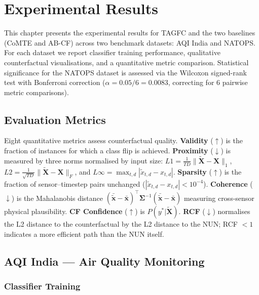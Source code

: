 \chapter{Experimental Results}

This chapter presents the experimental results for TAGFC and the two baselines (CoMTE and AB-CF) across two benchmark datasets: AQI India and NATOPS. For each dataset we report classifier training performance, qualitative counterfactual visualisations, and a quantitative metric comparison. Statistical significance for the NATOPS dataset is assessed via the Wilcoxon signed-rank test with Bonferroni correction ($\alpha = 0.05/6 = 0.0083$, correcting for 6 pairwise metric comparisons).

\section{Evaluation Metrics}

Eight quantitative metrics assess counterfactual quality. \textbf{Validity} ($\uparrow$) is the fraction of instances for which a class flip is achieved. \textbf{Proximity} ($\downarrow$) is measured by three norms normalised by input size: $L1 = \frac{1}{TD}\|\widetilde{\mathbf{X}}-\mathbf{X}\|_1$, $L2 = \frac{1}{\sqrt{TD}}\|\widetilde{\mathbf{X}}-\mathbf{X}\|_F$, and $L\infty = \max_{t,d}|\tilde{x}_{t,d}-x_{t,d}|$. \textbf{Sparsity} ($\uparrow$) is the fraction of sensor--timestep pairs unchanged ($|\tilde{x}_{t,d}-x_{t,d}|<10^{-4}$). \textbf{Coherence} ($\downarrow$) is the Mahalanobis distance $(\bar{\widetilde{\mathbf{x}}}-\bar{\mathbf{x}})^\top\boldsymbol{\Sigma}^{-1}(\bar{\widetilde{\mathbf{x}}}-\bar{\mathbf{x}})$ measuring cross-sensor physical plausibility. \textbf{CF Confidence} ($\uparrow$) is $P(y^*|\widetilde{\mathbf{X}})$. \textbf{RCF} ($\downarrow$) normalises the L2 distance to the counterfactual by the L2 distance to the NUN; RCF $<1$ indicates a more efficient path than the NUN itself.

\section{AQI India --- Air Quality Monitoring}

\subsection{Classifier Training}

